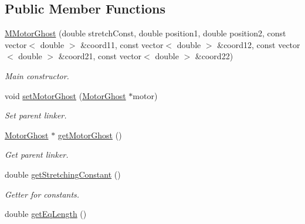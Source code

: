 \subsection*{Public Member Functions}
\begin{DoxyCompactItemize}
\item 
\hyperlink{classMMotorGhost_aa237f4dc8f2ec13841a2e348f2ca2016}{M\+Motor\+Ghost} (double stretch\+Const, double position1, double position2, const vector$<$ double $>$ \&coord11, const vector$<$ double $>$ \&coord12, const vector$<$ double $>$ \&coord21, const vector$<$ double $>$ \&coord22)
\begin{DoxyCompactList}\small\item\em Main constructor. \end{DoxyCompactList}\item 
void \hyperlink{classMMotorGhost_a629db9174d4bca0f43001f97fc37bea9}{set\+Motor\+Ghost} (\hyperlink{classMotorGhost}{Motor\+Ghost} $\ast$motor)
\begin{DoxyCompactList}\small\item\em Set parent linker. \end{DoxyCompactList}\item 
\hyperlink{classMotorGhost}{Motor\+Ghost} $\ast$ \hyperlink{classMMotorGhost_aa46956e65d843ae582530b80496cdc8f}{get\+Motor\+Ghost} ()
\begin{DoxyCompactList}\small\item\em Get parent linker. \end{DoxyCompactList}\end{DoxyCompactItemize}
{\bf }\par
\begin{DoxyCompactItemize}
\item 
double \hyperlink{classMMotorGhost_a67162e36027017554b7fe3bdc8bbf9c5}{get\+Stretching\+Constant} ()
\begin{DoxyCompactList}\small\item\em Getter for constants. \end{DoxyCompactList}\item 
double \hyperlink{classMMotorGhost_a49dd97a87f833f5815c0e6d152f78baa}{get\+Eq\+Length} ()
\end{DoxyCompactItemize}

